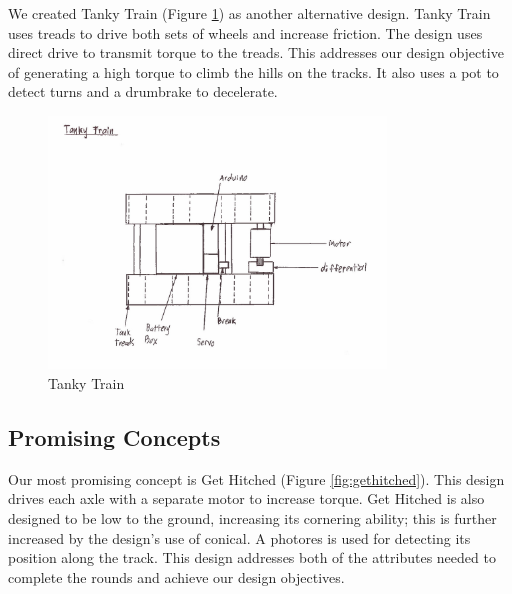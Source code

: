 \documentclass[class=../report, crop=false]{standalone}
\begin{document}
\clearpage

We created Tanky Train (Figure \ref{fig:tankytrain}) as another alternative design.
Tanky Train uses treads to drive both sets of wheels and increase friction.
The design uses direct drive to transmit \gls{torque} to the treads.
This addresses our design objective of generating a high \gls{torque} to climb the hills on the tracks.
It also uses a \gls{pot} to detect turns and a \gls{drumbrake} to decelerate.

\begin{figure}[H]
	\centering
	\includegraphics[width=0.8\textwidth]{../res/img/tankytrain}
	\caption{Tanky Train}
	\label{fig:tankytrain}
\end{figure}

\clearpage

\subsection{Promising Concepts}

Our most promising concept is Get Hitched (Figure \ref{fig:gethitched}).
This design drives each \gls{axle} with a separate motor to increase \gls{torque}.
Get Hitched is also designed to be low to the ground, increasing its cornering ability; this is further increased by the design’s use of \gls{conical}.
A \gls{photores} is used for detecting its position along the track.
This design addresses both of the attributes needed to complete the rounds and achieve our design objectives.
\end{document}
